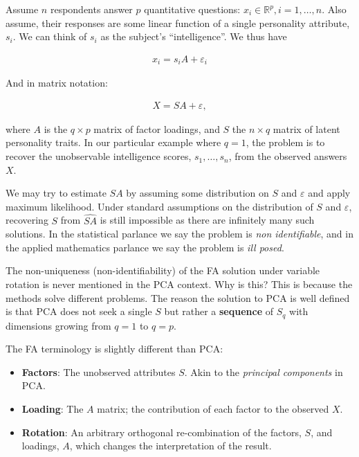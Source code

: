 \documentclass[]{book}
\theoremstyle{definition}
\theoremstyle{definition}
\theoremstyle{definition}
\theoremstyle{remark}
\let\BeginKnitrBlock\begin \let\EndKnitrBlock\end
\begin{document}
\BeginKnitrBlock{example}
\protect\hypertarget{exm:unnamed-chunk-230}{}{\label{exm:unnamed-chunk-230}
}Assume \(n\) respondents answer \(p\) quantitative questions:
\(x_i \in \mathbb{R}^p, i=1,\dots,n\). Also assume, their responses are
some linear function of a single personality attribute, \(s_i\). We can
think of \(s_i\) as the subject's ``intelligence''. We thus have

\begin{align}
    x_i = s_i A  + \varepsilon_i
\end{align}

And in matrix notation:

\begin{align}
    X = S A+\varepsilon,
    \label{eq:factor}
\end{align}

where \(A\) is the \(q \times p\) matrix of factor loadings, and \(S\)
the \(n \times q\) matrix of latent personality traits. In our
particular example where \(q=1\), the problem is to recover the
unobservable intelligence scores, \(s_1,\dots,s_n\), from the observed
answers \(X\).
\EndKnitrBlock{example}

We may try to estimate \(S A\) by assuming some distribution on \(S\)
and \(\varepsilon\) and apply maximum likelihood. Under standard
assumptions on the distribution of \(S\) and \(\varepsilon\), recovering
\(S\) from \(\widehat{S A }\) is still impossible as there are
infinitely many such solutions. In the statistical parlance we say the
problem is \emph{non identifiable}, and in the applied mathematics
parlance we say the problem is \emph{ill posed}.

\BeginKnitrBlock{remark}
{}The non-uniqueness (non-identifiability) of
the FA solution under variable rotation is never mentioned in the PCA
context. Why is this? This is because the methods solve different
problems. The reason the solution to PCA is well defined is that PCA
does not seek a single \(S\) but rather a \textbf{sequence} of \(S_q\)
with dimensions growing from \(q=1\) to \(q=p\).
\EndKnitrBlock{remark}

The FA terminology is slightly different than PCA:

\begin{itemize}
\item
  \textbf{Factors}: The unobserved attributes \(S\). Akin to the
  \emph{principal components} in PCA.
\item
  \textbf{Loading}: The \(A\) matrix; the contribution of each factor to
  the observed \(X\).
\item
  \textbf{Rotation}: An arbitrary orthogonal re-combination of the
  factors, \(S\), and loadings, \(A\), which changes the interpretation
  of the result.
\end{itemize}
\end{document}
